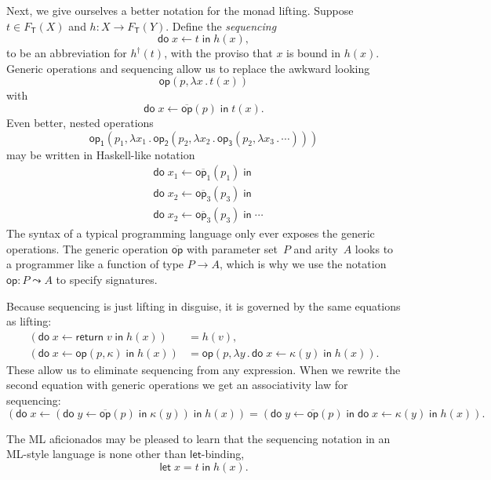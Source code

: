 \documentclass{amsart}
\newcommand{\theory}[1]{\mathsf{#1}} %
\newcommand{\Free}[2]{F_{\theory{#1}}(#2)} %
\newcommand{\lam}[1]{\lambda #1 \,.\,}
\newcommand{\opdecl}[3]{#1 : #2 \leadsto #3} %
\newcommand{\lift}[1]{#1^\dagger} %
\newcommand{\kode}[1]{\mathsf{#1}}
\newcommand{\seq}[2]{\kode{do}\; #1 \leftarrow #2 \;\kode{in}\;}
\newcommand{\xopgen}[2]{\overline{#1}(#2)}
\newcommand{\opgen}[2]{\xopgen{\kode{#1}}{#2}}
\newcommand{\opcall}[3]{\kode{#1}(#2, #3)}
\newcommand{\return}[1]{\kode{return}\;#1}
\begin{document}
Next, we give ourselves a better notation for the monad lifting. Suppose
$t \in \Free{T}{X}$ and $h : X \to \Free{T}{Y}$. Define the \emph{sequencing}
%
\begin{equation*}
  \seq{x}{t} h(x),
\end{equation*}
%
to be an abbreviation for $\lift{h}(t)$, with the proviso that $x$ is bound in
$h(x)$. Generic operations and sequencing allow us to replace the awkward
looking
%
\begin{equation*}
  \opcall{op}{p}{\lam{x} t(x)}
\end{equation*}
%
with
%
\begin{equation*}
  \seq{x}{\opgen{op}{p}} t(x).
\end{equation*}
%
Even better, nested operations
%
\begin{equation*}
  \opcall{op_1}{p_1}{\lam{x_1}
  \opcall{op_2}{p_2}{\lam{x_2}
  \opcall{op_3}{p_2}{\lam{x_3}
  \cdots
  }}}
\end{equation*}
%
may be written in Haskell-like notation
%
\begin{align*}
  &\seq{x_1}{\xopgen{\kode{op}_1}{p_1}} \\
  &\seq{x_2}{\xopgen{\kode{op}_3}{p_3}} \\
  &\seq{x_2}{\xopgen{\kode{op}_3}{p_3}}
  \cdots
\end{align*}
%
The syntax of a typical programming language only ever exposes the generic
operations. The generic operation $\overline{\kode{op}}$ with parameter set~$P$
and arity~$A$ looks to a programmer like a function of type $P \to A$, which is
why we use the notation $\opdecl{\kode{op}}{P}{A}$ to specify signatures.

Because sequencing is just lifting in disguise, it is governed by the same
equations as lifting:
%
\begin{align*}
  (\seq{x}{\return{v}} h(x)) &= h(v), \\
  (\seq{x}{\opcall{op}{p}{\kappa}} h(x)) &=
  \opcall{op}{p}{\lam{y} \seq{x}{\kappa(y)} h(x)}.
\end{align*}
%
These allow us to eliminate sequencing from any expression. When we rewrite the
second equation with generic operations we get an associativity law for
sequencing:
%
\begin{equation*}
  (\seq{x}{(\seq{y}{\opgen{op}{p}} \kappa(y))} h(x)) =
  (\seq{y}{\opgen{op}{p}} \seq{x}{\kappa(y)} h(x)).
\end{equation*}

The ML aficionados may be pleased to learn that the sequencing notation in
an ML-style language is none other than $\kode{let}$-binding,
%
\begin{equation*}
  \kode{let}\; x = t\;\kode{in}\;h(x).
\end{equation*}
\end{document}
